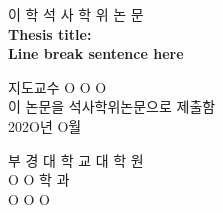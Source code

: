 \thispagestyle{empty}

\begin{center}
{\fontsize{14pt}{14}\selectfont
이 학 석 사 학 위 논 문}\\[1.5cm]

{\fontsize{22pt}{22}\selectfont
\textbf{Thesis title:\\
    Line break sentence here}\\[1.5cm]}

{\fontsize{14pt}{14}\selectfont
지도교수 O O O}\\[2cm]

{\fontsize{14pt}{14}\selectfont
이 논문을 석사학위논문으로 제출함}\\[1cm]

{\fontsize{14pt}{14}\selectfont
202O년 O월\\[1cm]}

{\fontsize{14pt}{14}\selectfont
부 경 대 학 교 대 학 원}\\[1cm]
{\fontsize{14pt}{14}\selectfont
O O 학 과}\\[1cm]
{\fontsize{14pt}{14}\selectfont
O O O}\\[1cm]
\end{center}

\newpage

